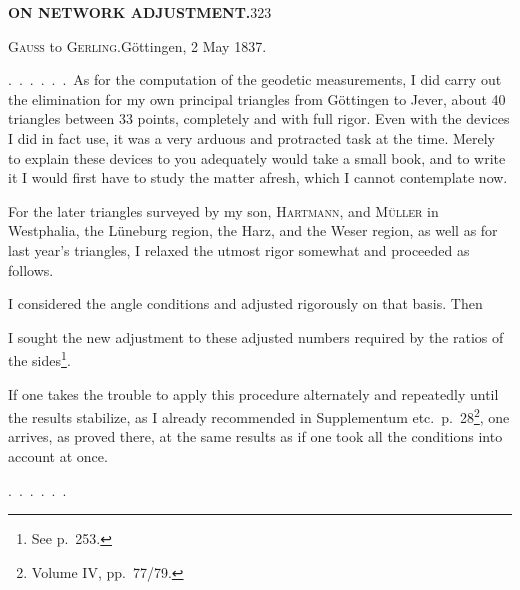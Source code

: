 \noindent\textbf{ON NETWORK ADJUSTMENT.}\hfill323
\begin{center}\textsc{Gauss} to \textsc{Gerling}.\quad Göttingen, 2 May 1837.\end{center}

.\ .\ .\ .\ .\ .\ As for the computation of the geodetic measurements, I did carry
out the elimination for my own principal triangles from Göttingen to Jever,
about 40 triangles between 33 points, completely and with full rigor. Even
with the devices I did in fact use, it was a very arduous and protracted
task at the time. Merely to explain these devices to you adequately would
take a small book, and to write it I would first have to study the matter
afresh, which I cannot contemplate now.

\begingroup
\def\letterfourstars{*}
\makeatletter
\renewcommand{\@makefnmark}{\hbox{\normalfont[\textsuperscript{\letterfourstars})]}}
\renewcommand{\@makefntext}[1]{\parindent1em\noindent\hbox to2em{\hss[\textsuperscript{\letterfourstars})\ }#1]}
\makeatother
For the later triangles surveyed by my son, \textsc{Hartmann}, and \textsc{Müller}
in Westphalia, the Lüneburg region, the Harz, and the Weser region, as well
as for last year's triangles, I relaxed the utmost rigor somewhat and
proceeded as follows.
\begin{list}{}{\setlength{\leftmargin}{2.4em}\setlength{\labelwidth}{1.5em}\setlength{\labelsep}{.5em}\setlength{\itemsep}{.3em}\setlength{\topsep}{.3em}}
\item[1)] I considered the angle conditions  and adjusted rigorously on that basis. Then
\item[2)] I sought the new adjustment to these adjusted numbers required by the
ratios of the sides\footnote{See p.\ 253.}.
\end{list}
\def\letterfourstars{**}
\par\noindent\hspace*{\parindent}If one takes the trouble to apply this procedure alternately and repeatedly
until the results stabilize, as I already recommended in
Supplementum etc.\ p.\ 28\footnote{Volume IV, pp.\ 77/79.}, one arrives, as proved there, at
 the same results as if one took all the conditions into account at once.
\par\medskip
.\ .\ .\ .\ .\ .
\endgroup
